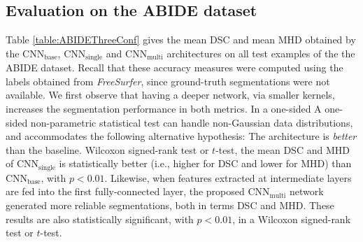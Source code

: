 \documentclass[twoside,fleqn,espcrc2]{elsarticle}
\newcommand{\CNNbase}{\mr{CNN}_\mr{base}}
\newcommand{\CNNsingle}{\mr{CNN}_\mr{single}}
\newcommand{\CNNmulti}{\mr{CNN}_\mr{multi}}
\newcommand{\mr}[1]{\mathrm{#1}}
\newcommand{\FreeSurfer}{\textit{FreeSurfer}}
\begin{document}
\subsection{Evaluation on the ABIDE dataset}
\label{ssec:ABIDEDatRes}

Table \ref{table:ABIDEThreeConf} gives the mean DSC and mean MHD obtained by the $\CNNbase$, $\CNNsingle$ and $\CNNmulti$ architectures on all test examples of the the ABIDE dataset. Recall that these accuracy measures were computed using the labels obtained from \FreeSurfer{}, since ground-truth segmentations were not available.
We first observe that having a deeper network, via smaller kernels, increases the segmentation performance in both metrics. In a one-sided A one-sided non-parametric statistical test can handle non-Gaussian data distributions, and accommodates the following alternative hypothesis: The architecture is \emph{better} than the baseline. Wilcoxon signed-rank test or $t$-test, the mean DSC and MHD of $\CNNsingle$ is statistically better (i.e., higher for DSC and lower for MHD) than $\CNNbase$, with $p < 0.01$. Likewise, when features extracted at intermediate layers are fed into the first fully-connected layer, the proposed $\CNNmulti$ network generated more reliable segmentations, both in terms DSC and MHD. These results are also statistically significant, with $p < 0.01$, in a Wilcoxon signed-rank test or $t$-test.
\end{document}
